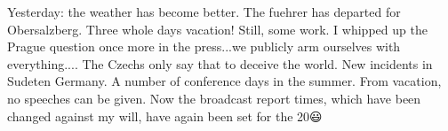 
Yesterday: the weather has become better. The fuehrer has departed for Obersalzberg. Three whole days vacation! Still, some work. I whipped up the Prague question once more in the press...we publicly arm ourselves with everything.... The Czechs only say that to deceive the world.  New incidents in Sudeten Germany. A number of conference days in the summer. From vacation, no speeches can be given. Now the broadcast report times, which have been changed against my will, have again been set for the 20😃